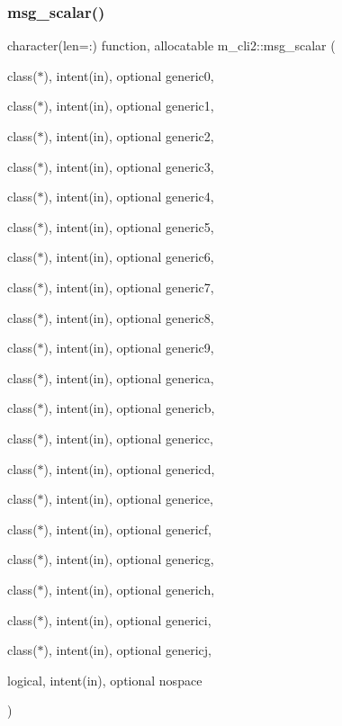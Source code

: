 \subsubsection{\texorpdfstring{msg\+\_\+scalar()}{msg\_scalar()}}
{\footnotesize\ttfamily character(len=\+:) function, allocatable m\+\_\+cli2\+::msg\+\_\+scalar (\begin{DoxyParamCaption}\item[{class($\ast$), intent(in), optional}]{generic0,  }\item[{class($\ast$), intent(in), optional}]{generic1,  }\item[{class($\ast$), intent(in), optional}]{generic2,  }\item[{class($\ast$), intent(in), optional}]{generic3,  }\item[{class($\ast$), intent(in), optional}]{generic4,  }\item[{class($\ast$), intent(in), optional}]{generic5,  }\item[{class($\ast$), intent(in), optional}]{generic6,  }\item[{class($\ast$), intent(in), optional}]{generic7,  }\item[{class($\ast$), intent(in), optional}]{generic8,  }\item[{class($\ast$), intent(in), optional}]{generic9,  }\item[{class($\ast$), intent(in), optional}]{generica,  }\item[{class($\ast$), intent(in), optional}]{genericb,  }\item[{class($\ast$), intent(in), optional}]{genericc,  }\item[{class($\ast$), intent(in), optional}]{genericd,  }\item[{class($\ast$), intent(in), optional}]{generice,  }\item[{class($\ast$), intent(in), optional}]{genericf,  }\item[{class($\ast$), intent(in), optional}]{genericg,  }\item[{class($\ast$), intent(in), optional}]{generich,  }\item[{class($\ast$), intent(in), optional}]{generici,  }\item[{class($\ast$), intent(in), optional}]{genericj,  }\item[{logical, intent(in), optional}]{nospace }\end{DoxyParamCaption})\hspace{0.3cm}{\ttfamily [private]}}



